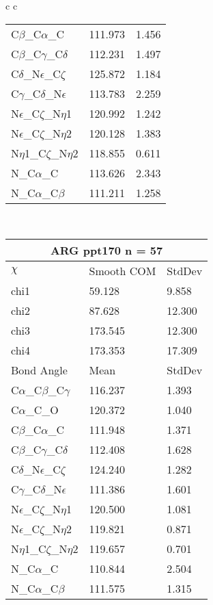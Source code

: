 \begin{longtable}{ c c }
\begin{tabular}{ l l l }
  C$\beta$\_C$\alpha$\_C & 111.973 & 1.456\\
  C$\beta$\_C$\gamma$\_C$\delta$ & 112.231 & 1.497\\
  C$\delta$\_N$\epsilon$\_C$\zeta$ & 125.872 & 1.184\\
  C$\gamma$\_C$\delta$\_N$\epsilon$ & 113.783 & 2.259\\
  N$\epsilon$\_C$\zeta$\_N$\eta$1 & 120.992 & 1.242\\
  N$\epsilon$\_C$\zeta$\_N$\eta$2 & 120.128 & 1.383\\
  N$\eta$1\_C$\zeta$\_N$\eta$2 & 118.855 & 0.611\\
  N\_C$\alpha$\_C & 113.626 & 2.343\\
  N\_C$\alpha$\_C$\beta$ & 111.211 & 1.258\\
  \bottomrule
  \end{tabular}
  \\
  \begin{tabular}{ l l l }
  \toprule
  \multicolumn{3}{c}{ARG \textbf{ppt170} n = 57} \\ \toprule
  $\chi$       & Smooth COM & StdDev \\ \midrule
  chi1 & 59.128 & 9.858 \\ 
  chi2 & 87.628 & 12.300 \\ 
  chi3 & 173.545 & 12.300 \\ 
  chi4 & 173.353 & 17.309 \\ \midrule
  Bond Angle   & Mean     & StdDev \\ \midrule
  C$\alpha$\_C$\beta$\_C$\gamma$ & 116.237 & 1.393\\
  C$\alpha$\_C\_O & 120.372 & 1.040\\
  C$\beta$\_C$\alpha$\_C & 111.948 & 1.371\\
  C$\beta$\_C$\gamma$\_C$\delta$ & 112.408 & 1.628\\
  C$\delta$\_N$\epsilon$\_C$\zeta$ & 124.240 & 1.282\\
  C$\gamma$\_C$\delta$\_N$\epsilon$ & 111.386 & 1.601\\
  N$\epsilon$\_C$\zeta$\_N$\eta$1 & 120.500 & 1.081\\
  N$\epsilon$\_C$\zeta$\_N$\eta$2 & 119.821 & 0.871\\
  N$\eta$1\_C$\zeta$\_N$\eta$2 & 119.657 & 0.701\\
  N\_C$\alpha$\_C & 110.844 & 2.504\\
  N\_C$\alpha$\_C$\beta$ & 111.575 & 1.315\\
  \bottomrule
  \end{tabular}

\end{longtable}
